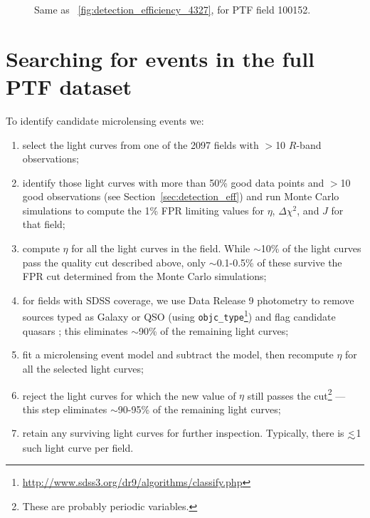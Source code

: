 \documentclass{emulateapj}
\newcommand{\lapprox }{{\lower0.8ex\hbox{$\buildrel <\over\sim$}}}
\begin{document}
\begin{figure}
\centering
	
\caption{Same as \figurename~\ref{fig:detection_efficiency_4327}, for PTF field 100152.}\label{fig:detection_efficiency_100152}
\end{figure}

\section{Searching for events in the full PTF dataset}\label{sec:search}
To identify candidate microlensing events we: %
\begin{enumerate}
	\item select the light curves from one of the 2097 fields with $>$10 $R$-band observations;
	\item identify those light curves with more than 50\% good data points and $>$10 good observations (see Section~\ref{sec:detection_eff}) and run Monte Carlo simulations to compute the 1\% FPR limiting values for $\eta$, $\Delta \chi^2$, and $J$ for that field;
	\item compute $\eta$ for all the light curves in the field. While $\sim$10\% of the light curves pass the quality cut described above, only $\sim$0.1-0.5\% of these survive the FPR cut determined from the Monte Carlo simulations;
	\item for fields with SDSS coverage, we use Data Release 9 photometry \citep{dr9paper} to remove sources typed as Galaxy or QSO (using \texttt{objc\_type}\footnote{\url{http://www.sdss3.org/dr9/algorithms/classify.php}}) and flag candidate quasars \citep[using the cuts described in][]{richards02}; this eliminates $\sim$90\% of the remaining light curves;
	\item fit a microlensing event model and subtract the model, then recompute $\eta$ for all the selected light curves;
	\item reject the light curves for which the new value of $\eta$ still passes the cut\footnote{These are probably periodic variables.} --- this step eliminates $\sim$90-95\% of the remaining light curves;
	\item retain any surviving light curves for further inspection. Typically, there is $\lapprox$1 such light curve per field.
\end{enumerate}
\end{document}
